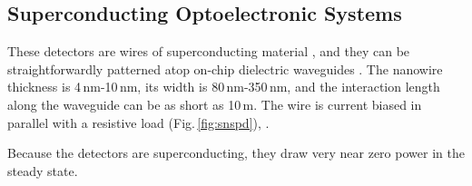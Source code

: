 \subsection{\label{sec:superconducting_optoelectronic}Superconducting Optoelectronic Systems}


These detectors are wires of superconducting material \cite{mave2013}, and they can be straightforwardly patterned atop on-chip dielectric waveguides \cite{shbu2017b,x,y,z}. The nanowire thickness is 4\,nm-10\,nm, its width is 80\,nm-350\,nm, and the interaction length along the waveguide can be as short as 10\,\textmu m. The wire is current biased in parallel with a resistive load (Fig.\,\ref{fig:snspd}), .

Because the detectors are superconducting, they draw very near zero power in the steady state. 



